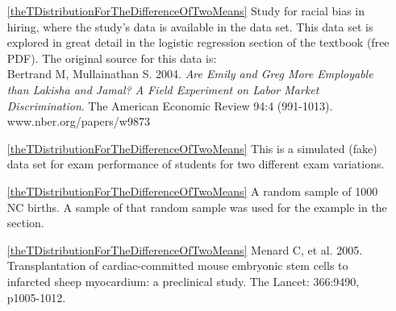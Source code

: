 \begin{itemize}
\item[\ref{theTDistributionForTheDifferenceOfTwoMeans}]
    Study for racial bias in hiring, where the study's data is available
    in the  data set.
    This data set is explored in great detail in the logistic regression
    section of the  textbook
    (free PDF).
    The original source for this data is:\\
    Bertrand M, Mullainathan S. 2004.
    \emph{Are Emily and Greg More Employable than Lakisha and Jamal?
    A Field Experiment on Labor Market Discrimination}.
    The American Economic Review 94:4 (991-1013).
        {www.nber.org/papers/w9873}

\item[\ref{theTDistributionForTheDifferenceOfTwoMeans}]
    This is a simulated (fake) data set for exam performance
    of students for two different exam variations.

\item[\ref{theTDistributionForTheDifferenceOfTwoMeans}]
    A random sample of 1000 NC births.
    A sample of that random sample was used for the example
    in the section.

\item[\ref{theTDistributionForTheDifferenceOfTwoMeans}]
        {Menard C, et al. 2005.
            Transplantation of cardiac-committed mouse embryonic
            stem cells to infarcted sheep myocardium:
            a preclinical study.
            The Lancet: 366:9490, p1005-1012.}

\end{itemize}







